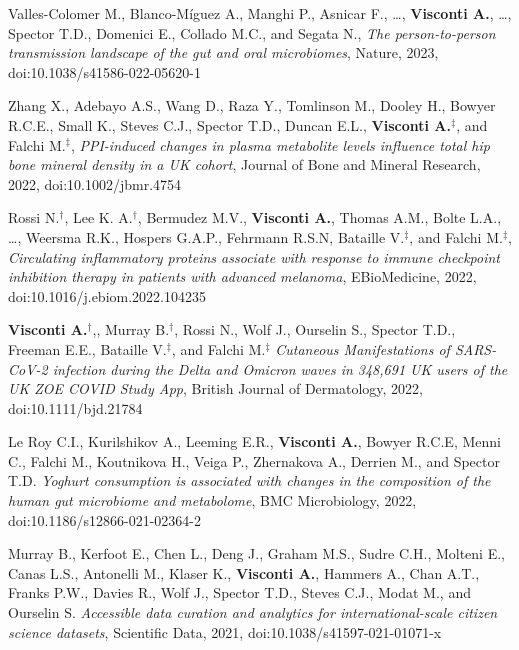 \documentclass[a4paper,10pt]{article}
\begin{document}
{\begin{itemize}
		  Valles-Colomer M., Blanco-Míguez A., Manghi P., Asnicar F., \dots, \textbf{Visconti A.}, \dots, Spector T.D., Domenici E., Collado M.C., and Segata N., \emph{The person-to-person transmission landscape of the gut and oral microbiomes}, Nature, 2023, doi:10.1038/s41586-022-05620-1
		
		 Zhang X., Adebayo A.S., Wang D., Raza Y., Tomlinson M., Dooley H., Bowyer R.C.E., Small K., Steves C.J., Spector T.D., Duncan E.L., \textbf{Visconti A.}$^{\textbf{$\ddag $}}$, and Falchi M.$^{\textbf{$\ddag $}}$, \emph{PPI-induced changes in plasma metabolite levels influence total hip bone mineral density in a UK cohort}, Journal of Bone and Mineral Research, 2022, doi:10.1002/jbmr.4754
				
  	    Rossi N.$^{\textbf{$\dag $}}$, Lee K. A.$^{\textbf{$\dag $}}$, Bermudez M.V., \textbf{Visconti A.}, Thomas A.M., Bolte L.A., \dots, Weersma R.K., Hospers G.A.P., Fehrmann R.S.N, Bataille V.$^{\textbf{$\ddag $}}$, and Falchi M.$^{\textbf{$\ddag $}}$, \emph{Circulating inflammatory proteins associate with response to immune checkpoint inhibition therapy in patients with advanced melanoma}, EBioMedicine, 2022, doi:10.1016/j.ebiom.2022.104235		
	
	 	\textbf{Visconti A.}$^{\textbf{$\dag $}}$,, Murray B.$^{\textbf{$\dag $}}$, Rossi N., Wolf J., Ourselin S., Spector T.D., Freeman E.E., Bataille V.$^{\textbf{$\ddag $}}$, and Falchi M.$^{\textbf{$\ddag $}}$ \emph{Cutaneous Manifestations of SARS-CoV-2 infection during the Delta and Omicron waves in 348,691 UK users of the UK ZOE COVID Study App}, British Journal of Dermatology, 2022, doi:10.1111/bjd.21784
				  
	   Le Roy C.I., Kurilshikov A., Leeming E.R., \textbf{Visconti A.}, Bowyer R.C.E, Menni C., Falchi M., Koutnikova H., Veiga P., Zhernakova A., Derrien M., and Spector T.D. \emph{Yoghurt consumption is associated with changes in the composition of the human gut microbiome and metabolome}, BMC Microbiology, 2022, doi:10.1186/s12866-021-02364-2
	
	   Murray B., Kerfoot E., Chen L., Deng J., Graham M.S., Sudre C.H., Molteni E., Canas L.S., Antonelli M., Klaser K., \textbf{Visconti A.}, Hammers A., Chan A.T., Franks P.W., Davies R., Wolf J., Spector T.D., Steves C.J., Modat M., and Ourselin S. \emph{Accessible data curation and analytics for international-scale citizen science datasets}, Scientific Data, 2021, doi:10.1038/s41597-021-01071-x

	\end{itemize}
}
\end{document}
